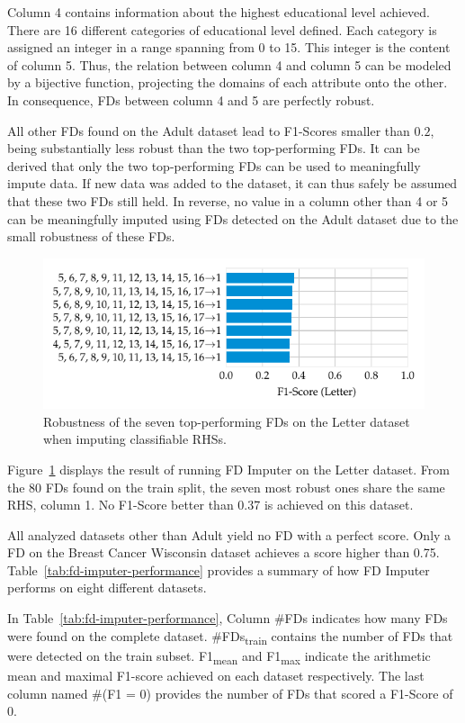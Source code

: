 Column 4 contains information about the highest educational level achieved.
There are 16 different categories of educational level defined.
Each category is assigned an integer in a range spanning from 0 to 15.
This integer is the content of column 5.
Thus, the relation between column 4 and column 5 can be modeled by a bijective function, projecting the domains of each attribute onto the other.
In consequence, FDs between column 4 and 5 are perfectly robust.

All other FDs found on the Adult dataset lead to F1-Scores smaller than \( 0.2\), being substantially less robust than the two top-performing FDs.
It can be derived that only the two top-performing FDs can be used to meaningfully impute data.
If new data was added to the dataset, it can thus safely be assumed that these two FDs still held.
In reverse, no value in a column other than 4 or 5 can be meaningfully imputed using FDs detected on the Adult dataset due to the small robustness of these FDs.
\begin{figure}[ht]
     \centering
     \includegraphics[width=\textwidth]{../figures/letter/f1_fd_imputer.pdf}
     \caption{Robustness of the seven top-performing FDs on the Letter dataset when imputing classifiable RHSs.}
     \label{fig:f1_fd_letter}
\end{figure}
Figure~\ref{fig:f1_fd_letter} displays the result of running FD Imputer on the Letter dataset.
From the 80 FDs found on the train split, the seven most robust ones share the same RHS, column 1.
No F1-Score better than 0.37 is achieved on this dataset.

All analyzed datasets other than Adult yield no FD with a perfect score.
Only a FD on the Breast Cancer Wisconsin dataset achieves a score higher than 0.75.
Table~\ref{tab:fd-imputer-performance} provides a summary of how FD Imputer performs on eight different datasets.

In Table~\ref{tab:fd-imputer-performance}, Column \#FDs indicates how many FDs were found on the complete dataset.
\#FDs\textsubscript{train} contains the number of FDs that were detected on the train subset.
F1\textsubscript{mean} and F1\textsubscript{max} indicate the arithmetic mean and maximal F1-score achieved on each dataset respectively.
The last column named \#(F1 = 0) provides the number of FDs that scored a F1-Score of 0.

